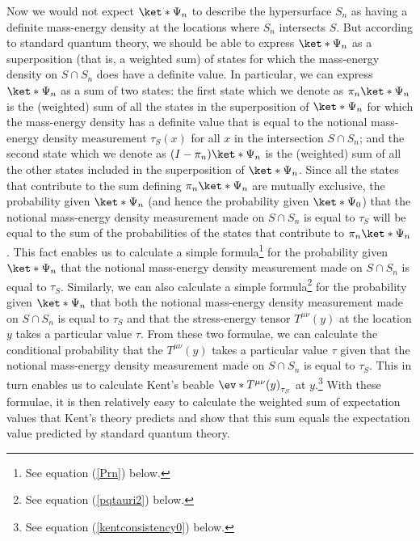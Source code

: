 \documentclass[12pt]{report}
\begin{document}
Now we would not expect $\ket*{\Psi_n}$ to describe the hypersurface $S_n$ as having a definite mass-energy density at the locations where $S_n$ intersects $S$. But according to standard quantum theory, we should be able to express $\ket*{\Psi_n}$ as a superposition (that is, a weighted sum) of states for which the mass-energy density on $S\cap S_n$ does have a definite value. In particular, we can express $\ket*{\Psi_n}$ as a sum of two states: the first state which we denote as $\pi_n \ket*{\Psi_n}$ \label{overviewpi}
is the (weighted) sum of all the states in the superposition of $\ket*{\Psi_n}$ for which the mass-energy density has a definite value that is equal to the notional mass-energy density measurement $\tau_S(x)$ for all $x$ in the intersection $S\cap S_n$; and the second state which we denote as $(I- \pi_n) \ket*{\Psi_n}$ is the (weighted) sum of all the other states included in the superposition of $\ket*{\Psi_n}$. Since all the states that contribute to the sum defining $\pi_n \ket*{\Psi_n}$ are mutually exclusive, the probability given $\ket*{\Psi_n}$ (and hence  the probability given $\ket*{\Psi_0}$) that the notional mass-energy density measurement made on $S\cap S_n$ is equal to $\tau_S$ will be equal to the sum of the probabilities of the states that contribute to $\pi_n \ket*{\Psi_n}$. This fact enables us to calculate a simple formula\footnote{See equation (\ref{Prn}) below.} for the probability given $\ket*{\Psi_n}$ that the notional mass-energy density measurement made on $S\cap S_n$ is equal to $\tau_S$. Similarly, we can also calculate a simple formula\footnote{See equation (\ref{pqtauri2}) below.} for the probability given $\ket*{\Psi_n}$ that both the notional mass-energy density measurement made on $S\cap S_n$ is equal to $\tau_S$ and that the stress-energy tensor $T^{\mu\nu}(y)$ at the location $y$ takes a particular value $\tau$. %
%
 From these two formulae, we can calculate the conditional probability that the $T^{\mu\nu}(y)$ takes a particular value $\tau$ given that the notional mass-energy density measurement made on $S\cap S_n$ is equal to $\tau_S$. This in turn enables us to calculate Kent's beable $\ev*{T^{\mu\nu}(y)}_{\tau_S}$ at $y$.\footnote{See equation (\ref{kentconsistency0}) below.} With these formulae, it is then relatively easy to calculate the weighted sum of expectation values that Kent's theory predicts and show that this sum equals the expectation value predicted by standard quantum theory.
\end{document}
